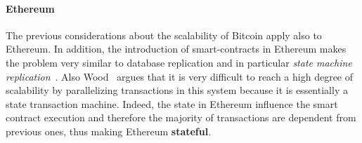 \paragraph{Ethereum} The previous considerations about the scalability of 
Bitcoin apply also to Ethereum. In addition, the introduction of 
smart-contracts in Ethereum makes the problem very similar to database 
replication and in particular \emph{state machine
replication}~\cite{bib:the-quest}. Also Wood~\cite{wood2018ethereum} argues
that  it is very difficult to reach a high degree of scalability by 
parallelizing transactions in this system because it is essentially a state 
transaction machine. Indeed, the state in Ethereum influence the smart contract 
execution and therefore the majority of transactions are dependent from 
previous ones, thus making Ethereum \textbf{stateful}.





